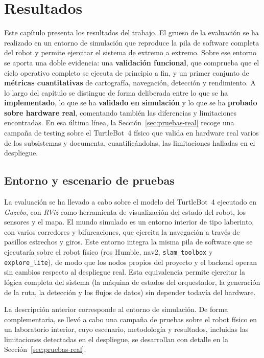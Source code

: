 \chapter{Resultados}
\label{cap:resultados}

Este capítulo presenta los resultados del trabajo. El grueso de la evaluación se ha realizado en
un entorno de simulación que reproduce la pila de software completa del robot y permite
ejercitar el sistema de extremo a extremo. Sobre ese entorno se aporta una doble
evidencia: una \textbf{validación funcional}, que comprueba que el ciclo operativo
completo se ejecuta de principio a fin, y un primer conjunto de \textbf{métricas
cuantitativas} de cartografía, navegación, detección y rendimiento. A lo largo del capítulo se
distingue de forma deliberada entre lo que se ha \textbf{implementado}, lo que se ha
\textbf{validado en simulación} y lo que se ha \textbf{probado sobre hardware real},
comentando también las diferencias y limitaciones encontradas. En esa última línea, la
Sección~\ref{sec:pruebas-real} recoge una campaña de testing sobre el \mbox{TurtleBot~4} físico
que valida en hardware real varios de los subsistemas y documenta, cuantificándolas, las
limitaciones halladas en el despliegue.

\section{Entorno y escenario de pruebas}
\label{sec:entorno-pruebas}

La evaluación se ha llevado a cabo sobre el modelo del \mbox{TurtleBot~4}
ejecutado en \textit{Gazebo}, con \textit{RViz} como herramienta de visualización del
estado del robot, los sensores y el mapa. El mundo simulado es un entorno interior de tipo
laberinto, con varios corredores y bifurcaciones, que ejercita la navegación a través de
pasillos estrechos y giros. Este entorno integra la misma pila de software que se
ejecutaría sobre el robot físico (\gls{ros} Humble, \gls{nav2}, \texttt{slam\_toolbox} y
\texttt{explore\_lite}), de modo que los nodos propios del proyecto y el backend operan sin
cambios respecto al despliegue real. Esta equivalencia permite ejercitar la lógica completa
del sistema (la máquina de estados del orquestador, la generación de la ruta, la detección
y los flujos de datos) sin depender todavía del hardware.

La descripción anterior corresponde al entorno de simulación. De forma complementaria, se
llevó a cabo una campaña de pruebas sobre el robot físico en un laboratorio interior, cuyo
escenario, metodología y resultados, incluidas las limitaciones detectadas en el despliegue, se
desarrollan con detalle en la Sección~\ref{sec:pruebas-real}.

